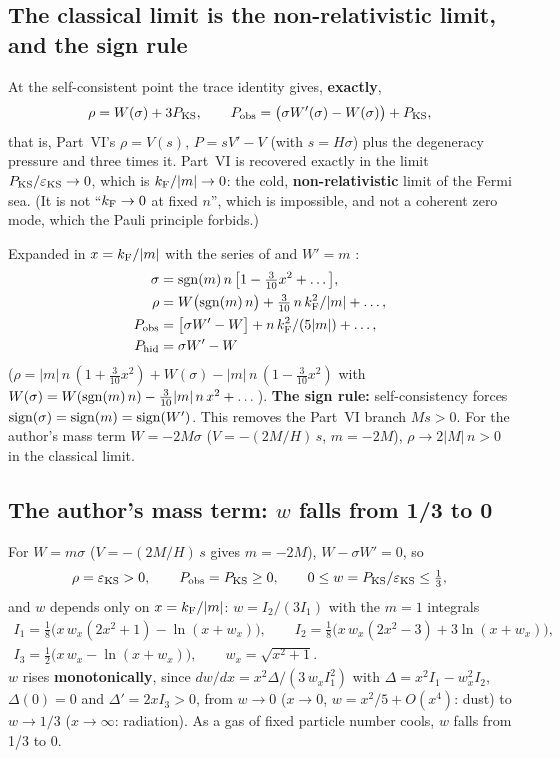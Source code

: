 \subsection{The classical limit is the non-relativistic limit, and the sign rule}
\label{sec:8.7}

At the self-consistent point the trace identity gives, \textbf{exactly},
\[
  \rho=W(\sigma)+3P_{\mathrm{KS}},\qquad P_{\mathrm{obs}}=\bigl(\sigma W'(\sigma)-W(\sigma)\bigr)+P_{\mathrm{KS}} ,
\]
that is, Part~VI's $\rho=V(s)$, $P=sV'-V$ (with $s=H\sigma$) plus the degeneracy pressure and three
times it. Part~VI is recovered exactly in the limit $P_{\mathrm{KS}}/\varepsilon_{\mathrm{KS}}\to0$, which is $k_{\mathrm{F}}/|m|\to0$: the
cold, \textbf{non-relativistic} limit of the Fermi sea. (It is not ``$k_{\mathrm{F}}\to0$ at fixed $n$'', which
is impossible, and not a coherent zero mode, which the Pauli principle forbids.) 

Expanded in $x=k_{\mathrm{F}}/|m|$ with the series of  and $W'=m$ \cfderived:
\begin{align*}
  \sigma&=\operatorname{sgn}(m)\,n\,\bigl[1-\tfrac{3}{10}x^2+\dots\bigr],\\
  \rho&=W\bigl(\operatorname{sgn}(m)\,n\bigr)+\tfrac{3}{10}\,n\,k_{\mathrm{F}}^2/|m|+\dots,\\
  P_{\mathrm{obs}}&=\bigl[\sigma W'-W\bigr]+n\,k_{\mathrm{F}}^2/(5|m|)+\dots,\\
  P_{\mathrm{hid}}&=\sigma W'-W
\end{align*}
($\rho=|m|\,n\,(1+\frac{3}{10}x^2)+W(\sigma)-|m|\,n\,(1-\frac{3}{10}x^2)$ with
$W(\sigma)=W(\operatorname{sgn}(m)\,n)-\frac{3}{10}|m|\,n\,x^2+\dots$). \textbf{The sign rule:} self-consistency
forces $\operatorname{sign}(\sigma)=\operatorname{sign}(m)=\operatorname{sign}(W')$. This removes the Part~VI branch $Ms>0$. For the author's
mass term $W=-2M\sigma$ ($V=-(2M/H)\,s$, $m=-2M$), $\rho\to2|M|\,n>0$ in the classical limit.

\subsection{The author's mass term: \texorpdfstring{$w$}{w} falls from 1/3 to 0}
\label{sec:8.8}

For $W=m\sigma$ ($V=-(2M/H)\,s$ gives $m=-2M$), $W-\sigma W'=0$, so
\[
  \rho=\varepsilon_{\mathrm{KS}}>0,\qquad P_{\mathrm{obs}}=P_{\mathrm{KS}}\geq0,\qquad 0\leq w=P_{\mathrm{KS}}/\varepsilon_{\mathrm{KS}}\leq\tfrac13 ,
\]
and $w$ depends only on $x=k_{\mathrm{F}}/|m|$: $w=I_2/(3I_1)$ with the $m=1$ integrals
\begin{gather*}
  I_1=\tfrac18\bigl(x\,w_x(2x^2+1)-\ln(x+w_x)\bigr),\qquad
  I_2=\tfrac18\bigl(x\,w_x(2x^2-3)+3\ln(x+w_x)\bigr),\\
  I_3=\tfrac12\bigl(x\,w_x-\ln(x+w_x)\bigr),\qquad w_x=\sqrt{x^2+1}.
\end{gather*}
$w$ rises \textbf{monotonically}, since $dw/dx=x^2\Delta/(3\,w_x I_1^2)$ with
$\Delta=x^2I_1-w_x^2I_2$, $\Delta(0)=0$ and $\Delta'=2xI_3>0$, from $w\to0$ ($x\to0$,
$w=x^2/5+O(x^4)$: dust) to $w\to1/3$ ($x\to\infty$: radiation). As a gas of fixed particle number
cools, $w$ falls from 1/3 to 0.

